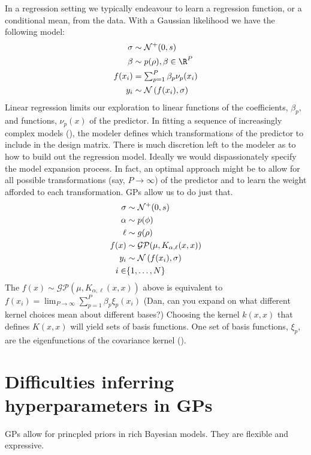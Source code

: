 \documentclass{article}
\newcommand{\lp}{\ensuremath{\left(}}
\newcommand{\rp}{\ensuremath{\right)}}
\begin{document}
In a regression setting we typically endeavour to learn a regression function,
or a conditional mean, from the data. With a Gaussian likelihood we have the
following model:
%
\begin{align*}
  \sigma & \sim \mathcal{N}^+(0, s) \\
  \beta & \sim p(\rho), \beta \in \R^P \\
  f(x_i) & = \textstyle \sum_{p=1}^P \beta_p \nu_p(x_i) \\
  y_i & \sim \mathcal{N}\lp f(x_i),
  \sigma\rp 
\end{align*}
%
Linear regression limits our exploration to linear functions of the
coefficients, $\beta_p$, and functions, $\nu_p(x)$ of the predictor. In fitting
a sequence of increasingly complex models (\citet{gelman2014bayesian}), the
modeler defines which transformations of the predictor to include in the design
matrix. There is much discretion left to the modeler as to how to build out the
regression model. Ideally we would dispassionately specify the model expansion
process. In fact, an optimal approach might be to allow for all possible
transformations (say, $P \rightarrow \infty$) of the predictor and to learn the
weight afforded to each transformation. GPs allow us to do just that.
%
\begin{align*}
  \sigma & \sim \mathcal{N}^+(0, s) \\
  \alpha & \sim p(\phi) \\
  \ell & \sim g(\rho) \\
  f(x) & \sim \mathcal{GP}(\mu, K_{\alpha, \ell}(x, x)) \\
  y_i & \sim \mathcal{N}\lp f(x_i),
  \sigma\rp  \\
  i \in & \{1, \dots, N\}
\end{align*}
%
The $f(x) \sim \mathcal{GP}(\mu, K_{\alpha, \ell}(x, x))$ above is equivalent to
$f(x_i)  = \textstyle \lim_{P \to \infty} \sum_{p=1}^P \beta_p \xi_p(x_i)$
(Dan, can you expand on what different kernel choices mean about different bases?)
Choosing the kernel $k(x, x)$ that defines $K(x, x)$ will yield sets of 
basis functions. One set of basis functions, $\xi_p$, are the eigenfunctions 
of the covariance kernel (\citet{rasmussen2005gaussian}).

\section{Difficulties inferring hyperparameters in GPs}

GPs allow for princpled priors in rich Bayesian models. They are flexible and
expressive. 
\end{document}
